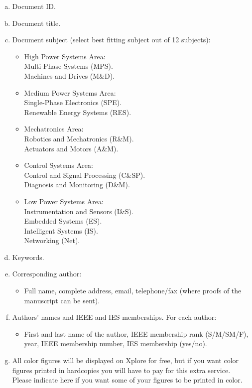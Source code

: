 \documentclass[journal]{IEEEtranTIE}
\begin{document}
\begin{enumerate}[1)]
	\begin{enumerate}[a.]
		\item Document ID.
		\item Document title.
		\item Document subject (select best fitting subject out of 12 subjects):
			\begin{itemize}
			\item High Power Systems Area: 
			\\Multi-Phase Systems (MPS).
			\\Machines and Drives (M\&D).
			\item Medium Power Systems Area:
			\\Single-Phase Electronics (SPE).
			\\Renewable Energy Systems (RES).
			\item Mechatronics Area:
			\\Robotics and Mechatronics (R\&M).
			\\Actuators and Motors (A\&M).
			\item Control Systems Area:
			\\Control and Signal Processing (C\&SP).
			\\Diagnosis and Monitoring (D\&M).
			\item Low Power Systems Area:
			\\Instrumentation and Sensors (I\&S).
			\\Embedded Systems (ES).
			\\Intelligent Systems (IS).
			\\Networking (Net).
			\end{itemize}
		\item Keywords.
		\item Corresponding author:
		\begin{itemize}
			\item Full name, complete address, email, telephone/fax (where proofs of the manuscript can be sent).				 
		\end{itemize}				
		\item Authors' names and IEEE and IES memberships. For each author:
		\begin{itemize}
			\item First and last name of the author, IEEE membership rank (S/M/SM/F), year, IEEE membership number, IES membership (yes/no).
		\end{itemize}
		\item All color figures will be displayed on Xplore for free, but if you want color figures printed in hardcopies you will have to pay for this extra service. Please indicate here if you want some of your figures to be printed in color.
	\end{enumerate}
\end{enumerate}
\end{document}
